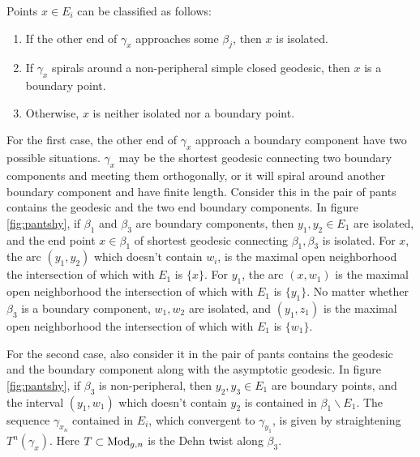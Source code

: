 \begin{theorem}\label{classify}
Points $x\in E_i$ can be classified as follows:
\begin{enumerate}
    \item If the other end of $\gamma_x$ approaches some $\beta_j$, then $x$ is isolated.
    \item If $\gamma_x$ spirals around a non-peripheral simple closed geodesic, then $x$ is a boundary point.
    \item Otherwise, $x$ is neither isolated nor a boundary point.
\end{enumerate}
\end{theorem} 

\begin{remark}


For the first case, the other end of $\gamma_x$ approach a boundary component have two possible situations. $\gamma_x$ may be the shortest geodesic connecting two boundary components and meeting them orthogonally,  or it will spiral around another boundary component and have finite length. Consider this in the pair of pants contains the geodesic and the two end boundary components.  In figure \ref{fig:pantshy}, if $\beta_1$ and $\beta_3$ are boundary components, then $y_1,y_2\in E_1$ are isolated, and the end point $x\in \beta_1$ of shortest geodesic connecting $\beta_1,\beta_3$ is isolated. For $x$, the arc $(y_1,y_2)$ which doesn't contain $w_i$, is the maximal open neighborhood the intersection of which with  $E_1$ is $\{x\}$. For $y_1$, the arc $(x,w_1)$ is the maximal open neighborhood the intersection of which with  $E_1$ is $\{y_1\}$. No matter whether $\beta_3$ is a boundary component, $w_1,w_2$ are isolated, and $(y_1,z_1)$ is the maximal open neighborhood the intersection of which with  $E_1$ is $\{w_1\}$.

For the second case, also consider it in the pair of pants contains the geodesic and the boundary component along with the asymptotic geodesic. In figure \ref{fig:pantshy}, if $\beta_3$ is non-peripheral, then $y_2,y_3\in E_1$ are boundary points, and the interval $(y_1,w_1)$ which doesn't contain $y_2$  is contained in $\beta_1\backslash E_1$. The sequence ${\gamma_{x_n}}$ contained in $E_i$, which convergent to $\gamma_{y_1}$, is   given by straightening $T^n(\gamma_x)$. Here $T\subset \operatorname{Mod}_{g,n}$ is the Dehn twist along $\beta_3$.  
\end{remark}




